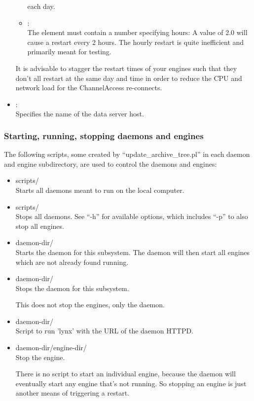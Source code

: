 \begin{itemize}
\begin{itemize}
         each day.
      \item {}:\\
         The element must contain a number specifying hours: A value
	 of 2.0 will cause a restart every 2 hours. The hourly restart
	 is quite inefficient and primarily meant for testing.
      \end{itemize}
      \NOTE It is advisable to stagger the restart times of your engines
      such that they don't all restart at the same day and time in order to
      reduce the CPU and network load for the ChannelAccess re-connects.
\item {}:\\
      Specifies the name of the data server host.
\end{itemize}



\subsubsection{Starting, running, stopping daemons and engines}
The following scripts, some created by ``update\_archive\_tree.pl'' in
each daemon and engine subdirectory, are used to control the daemons
and engines:
\begin{itemize}
\item scripts/ \\
      Starts all daemons meant to run on the local computer.
\item scripts/ \\
      Stops all daemons. See ``-h'' for available options, which
      includes ``-p'' to also stop all engines.
\item daemon-dir/ \\
      Starts the daemon for this subsystem.
      The daemon will then start all engines which are not already
      found running.
\item daemon-dir/ \\
      Stops the daemon for this subsystem.

      \NOTE This does not stop the engines, only the daemon.
\item daemon-dir/ \\
      Script to run 'lynx' with the URL of the daemon HTTPD.
\item daemon-dir/engine-dir/ \\
      Stop the engine.

      \NOTE There is no script to start an individual engine, because the
      daemon will eventually start any engine that's not running.
      So stopping an engine is just another means of triggering a
      restart.
\end{itemize}

